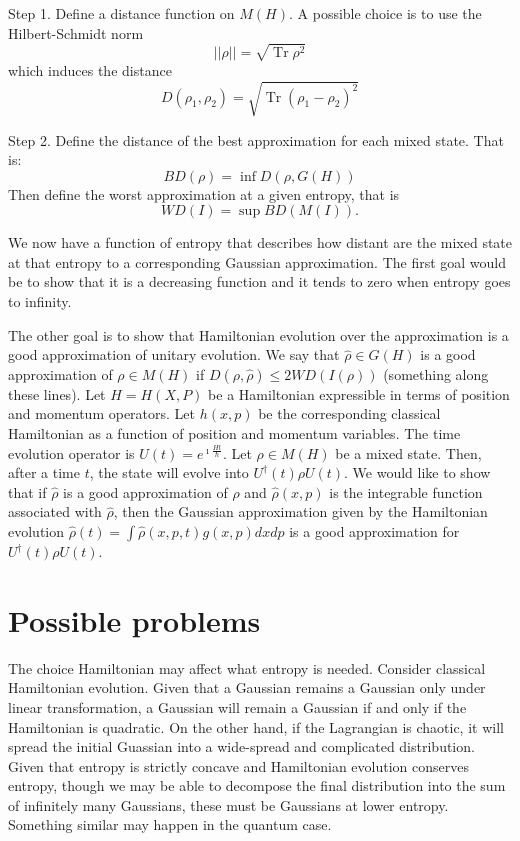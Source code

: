 \documentclass[11pt]{article}
\DeclareMathOperator{\Tr}{Tr}
\begin{document}
Step 1. Define a distance function on $M(H)$. A possible choice is to use the Hilbert-Schmidt norm
\begin{equation}
	||\rho|| = \sqrt{\Tr \rho^2}
\end{equation}
which induces the distance
\begin{equation}
	D(\rho_1, \rho_2) = \sqrt{\Tr (\rho_1 - \rho_2)^2}
\end{equation}

Step 2. Define the distance of the best approximation for each mixed state. That is:
\begin{equation}
	BD(\rho) = \inf D(\rho, G(H))
\end{equation}
Then define the worst approximation at a given entropy, that is
\begin{equation}
	WD(I) = \sup BD(M(I)).
\end{equation}

We now have a function of entropy that describes how distant are the mixed state at that entropy to a corresponding Gaussian approximation. The first goal would be to show that it is a decreasing function and it tends to zero when entropy goes to infinity.

The other goal is to show that Hamiltonian evolution over the approximation is a good approximation of unitary evolution. We say that $\hat{\rho} \in G(H)$ is a good approximation of $\rho \in M(H)$ if $D(\rho, \hat{\rho}) \leq 2 WD(I(\rho))$ (something along these lines). Let $H = H(X,P)$ be a Hamiltonian expressible in terms of position and momentum operators. Let $h(x,p)$ be the corresponding classical Hamiltonian as a function of position and momentum variables. The time evolution operator is $U(t)= e^{\imath \frac{Ht}{\hbar}}$. Let $\rho \in M(H)$ be a mixed state. Then, after a time $t$, the state will evolve into $U^\dagger(t) \rho U(t)$. We would like to show that if $\hat{\rho}$ is a good approximation of $\rho$ and $\hat{\rho}(x,p)$ is the integrable function associated with $\hat{\rho}$, then the Gaussian approximation given by the Hamiltonian evolution $\hat{\rho}(t) = \int \hat{\rho}(x,p,t) g(x,p) dx dp$ is a good approximation for $U^\dagger(t) \rho U(t)$.

\section{Possible problems}

The choice Hamiltonian may affect what entropy is needed. Consider classical Hamiltonian evolution. Given that a Gaussian remains a Gaussian only under linear transformation, a Gaussian will remain a Gaussian if and only if the Hamiltonian is quadratic. On the other hand, if the Lagrangian is chaotic, it will spread the initial Guassian into a wide-spread and complicated distribution. Given that entropy is strictly concave and Hamiltonian evolution conserves entropy, though we may be able to decompose the final distribution into the sum of infinitely many Gaussians, these must be Gaussians at lower entropy. Something similar may happen in the quantum case.
\end{document}
